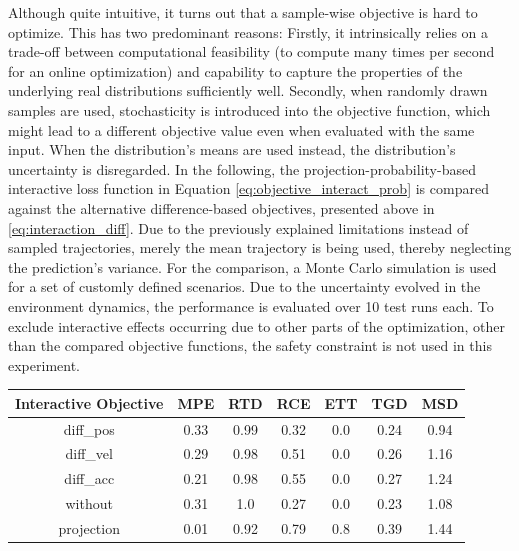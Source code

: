 Although quite intuitive, it turns out that a sample-wise objective is hard to optimize. This has two predominant reasons: Firstly, it intrinsically relies on a trade-off between computational feasibility (to compute many times per second for an online optimization) and capability to capture the properties of the underlying real distributions sufficiently well. Secondly, when randomly drawn samples are used, stochasticity is introduced into the objective function, which might lead to a different objective value even when evaluated with the same input. When the distribution's means are used instead, the distribution's uncertainty is disregarded.
\newline
In the following, the projection-probability-based interactive loss function in Equation \ref{eq:objective_interact_prob} is compared against the alternative difference-based objectives, presented above in \ref{eq:interaction_diff}. Due to the previously explained limitations instead of sampled trajectories, merely the mean trajectory is being used, thereby neglecting the prediction's variance. For the comparison, a Monte Carlo simulation is used for a set of customly defined scenarios. Due to the uncertainty evolved in the environment dynamics, the performance is evaluated over 10 test runs each. To exclude interactive effects occurring due to other parts of the optimization, other than the compared objective functions, the safety constraint is not used in this experiment. \\ 

\begin{table}[!ht]
\begin{center}
\begin{tabular}{c|c|c|c|c|c|c}
\bf Interactive Objective & \bf MPE & \bf RTD & \bf RCE & \bf ETT & \bf TGD & \bf MSD \\
\hline
diff\_pos & 0.33 & 0.99 & 0.32 & 0.0 & 0.24 & 0.94 \\
\hline
diff\_vel & 0.29 & 0.98 & 0.51 & 0.0 & 0.26 & 1.16 \\
\hline
diff\_acc & 0.21 & 0.98 & 0.55 & 0.0 & 0.27 & 1.24 \\ 
\hline
\rowcolor{baseline_color}
without & 0.31 & 1.0 & 0.27 & 0.0 & 0.23 & 1.08 \\ 
\hline
\rowcolor{our_color}
projection & 0.01 & 0.92 & 0.79 & 0.8 & 0.39 & 1.44 
\end{tabular}
\end{center}
\label{table:interactive_objective}
\end{table}


